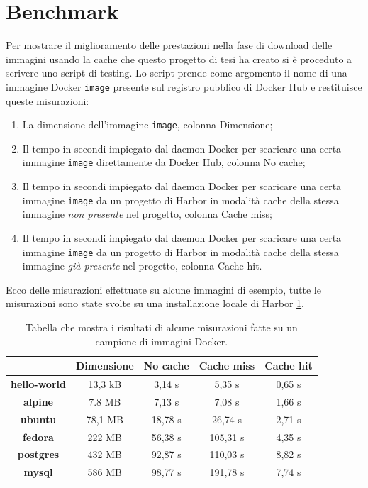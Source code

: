 \documentclass[12pt]{report}
\begin{document}
\section{Benchmark}
Per mostrare il miglioramento delle prestazioni nella fase di download delle immagini usando la cache che questo progetto di tesi ha creato si è proceduto a scrivere uno script di testing. Lo script prende come argomento il nome di una immagine Docker \texttt{image} presente sul registro pubblico di Docker Hub e restituisce queste misurazioni:
\begin{enumerate}
    \item La dimensione dell'immagine \texttt{image}, colonna Dimensione;
    \item Il tempo in secondi impiegato dal daemon Docker per scaricare una certa immagine \texttt{image} direttamente da Docker Hub, colonna No cache;
    \item Il tempo in secondi impiegato dal daemon Docker per scaricare una certa immagine \texttt{image} da un progetto di Harbor in modalità cache della stessa immagine \textit{non presente} nel progetto, colonna Cache miss;
    \item Il tempo in secondi impiegato dal daemon Docker per scaricare una certa immagine \texttt{image} da un progetto di Harbor in modalità cache della stessa immagine \textit{già presente} nel progetto, colonna Cache hit.
\end{enumerate}
Ecco delle misurazioni effettuate su alcune immagini di esempio, tutte le misurazioni sono state svolte su una installazione locale di Harbor \ref{table:benchmark}.
\begin{table}[]
    \begin{tabular}{|c|c|c|c|c|}
    \hline
                         & \textbf{Dimensione} & \textbf{No cache} & \textbf{Cache miss} & \textbf{Cache hit} \\ \hline
    \textbf{hello-world} & 13,3 kB             & 3,14 s            & 5,35 s              & 0,65 s             \\ \hline
    \textbf{alpine}      & 7.8 MB              & 7,13 s            & 7,08 s              & 1,66 s             \\ \hline
    \textbf{ubuntu}      & 78,1 MB             & 18,78 s           & 26,74 s             & 2,71 s             \\ \hline
    \textbf{fedora}      & 222 MB              & 56,38 s           & 105,31 s            & 4,35 s             \\ \hline
    \textbf{postgres}    & 432 MB              & 92,87 s           & 110,03 s            & 8,82 s             \\ \hline
    \textbf{mysql}       & 586 MB              & 98,77 s           & 191,78 s            & 7,74 s             \\ \hline
    \end{tabular}
    \caption{Tabella che mostra i risultati di alcune misurazioni fatte su un campione di immagini Docker.}
    \label{table:benchmark}
\end{table}
\end{document}
